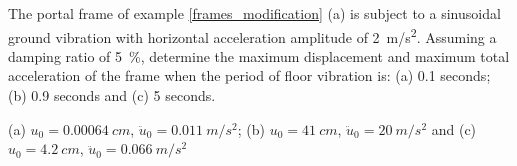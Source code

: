 
\begin{Exercise}[label={frame_ground_acceleration}]
The portal frame of example \ref{frames_modification} (a) is subject to a sinusoidal ground vibration with horizontal acceleration amplitude of \qty{2}{m/s^2}. Assuming a damping ratio of \qty{5}{\%}, determine the maximum displacement and maximum total acceleration of the frame when the period of floor vibration is: (a) 0.1 seconds; (b) 0.9 seconds and (c) 5 seconds.

\begin{center}
\end{center}

\shortAnswer (a) $u_0 = \SI{0.00064}{cm}$, $\ddot{u}_0 = \SI{0.011}{m/s^2}$; (b) $u_0 = \SI{41}{cm}$, $\ddot{u}_0 = \SI{20}{m/s^2}$ and (c) $u_0 = \SI{4.2}{cm}$, $\ddot{u}_0 = \SI{0.066}{m/s^2}$
\end{Exercise}



